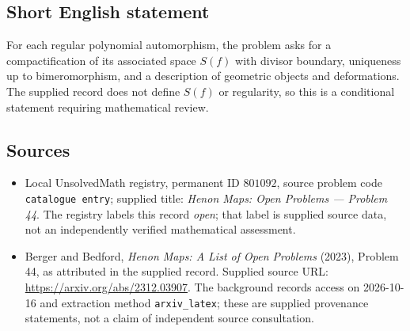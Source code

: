 \documentclass[11pt]{article}
\begin{document}
\subsection{Short English statement}
For each regular polynomial automorphism, the problem asks for a compactification of its associated space \(S(f)\) with divisor boundary, uniqueness up to bimeromorphism, and a description of geometric objects and deformations. The supplied record does not define \(S(f)\) or regularity, so this is a conditional statement requiring mathematical review.
\subsection{Sources}
\begin{itemize}
\item Local UnsolvedMath registry, permanent ID \(801092\), source problem code \texttt{catalogue entry}; supplied title: \emph{Henon Maps: Open Problems --- Problem 44}. The registry labels this record \emph{open}; that label is supplied source data, not an independently verified mathematical assessment.
\item Berger and Bedford, \emph{Henon Maps: A List of Open Problems} (2023), Problem 44, as attributed in the supplied record. Supplied source URL: \url{https://arxiv.org/abs/2312.03907}. The background records access on 2026-10-16 and extraction method \texttt{arxiv\_latex}; these are supplied provenance statements, not a claim of independent source consultation.
\end{itemize}
\end{document}
